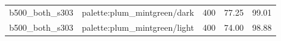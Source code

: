 \begin{longtable}{l>{\raggedright\arraybackslash}p{.42\linewidth}rrr}
b500\_\allowbreak{}both\_\allowbreak{}s303 & %
palette:plum\_\allowbreak{}mintgreen/dark & %
400 & %
77.25 & %
99.01 \\ %

b500\_\allowbreak{}both\_\allowbreak{}s303 & %
palette:plum\_\allowbreak{}mintgreen/light & %
400 & %
74.00 & %
98.88 \\ %


\end{longtable}
